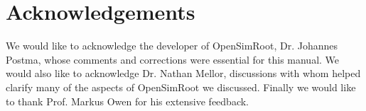 \documentclass{article}
\begin{document}
\section{Acknowledgements}

We would like to acknowledge the developer of OpenSimRoot, Dr. Johannes Postma, whose comments and corrections were essential for this manual. We would also like to acknowledge Dr. Nathan Mellor, discussions with whom helped clarify many of the aspects of OpenSimRoot we discussed. Finally we would like to thank Prof. Markus Owen for his extensive feedback.



\end{document}
